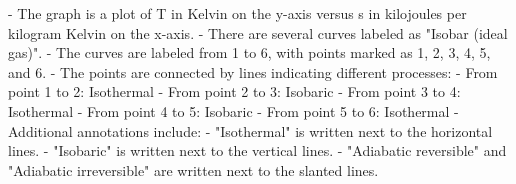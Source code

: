 - The graph is a plot of T in Kelvin on the y-axis versus s in kilojoules per kilogram Kelvin on the x-axis.
- There are several curves labeled as "Isobar (ideal gas)".
- The curves are labeled from 1 to 6, with points marked as 1, 2, 3, 4, 5, and 6.
- The points are connected by lines indicating different processes:
    - From point 1 to 2: Isothermal
    - From point 2 to 3: Isobaric
    - From point 3 to 4: Isothermal
    - From point 4 to 5: Isobaric
    - From point 5 to 6: Isothermal
- Additional annotations include:
    - "Isothermal" is written next to the horizontal lines.
    - "Isobaric" is written next to the vertical lines.
    - "Adiabatic reversible" and "Adiabatic irreversible" are written next to the slanted lines.